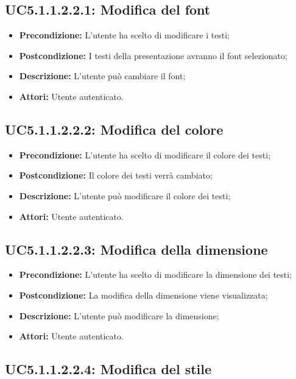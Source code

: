 \subsection{ UC5.1.1.2.2.1: Modifica del font}

\begin{itemize}
	\item \textbf{Precondizione:} L'utente ha scelto di modificare i testi;
	\item \textbf{Postcondizione:} I testi della presentazione avranno il font selezionato;
	\item \textbf{Descrizione:} L'utente può cambiare il font;
	\item \textbf{Attori:} Utente autenticato.
\end{itemize}
\subsection{ UC5.1.1.2.2.2: Modifica del colore}

\begin{itemize}
	\item \textbf{Precondizione:} L'utente ha scelto di modificare il colore dei testi;
	\item \textbf{Postcondizione:} Il colore dei testi verrà cambiato;
	\item \textbf{Descrizione:} L'utente può modificare il colore dei testi;
	\item \textbf{Attori:} Utente autenticato.
\end{itemize}
\subsection{ UC5.1.1.2.2.3: Modifica della dimensione }

\begin{itemize}
	\item \textbf{Precondizione:} L'utente ha scelto di modificare la dimensione dei testi;
	\item \textbf{Postcondizione:} La modifica della dimensione viene visualizzata;
	\item \textbf{Descrizione:} L'utente può modificare la dimensione;
	\item \textbf{Attori:} Utente autenticato.
\end{itemize}
\subsection{ UC5.1.1.2.2.4: Modifica del stile}


